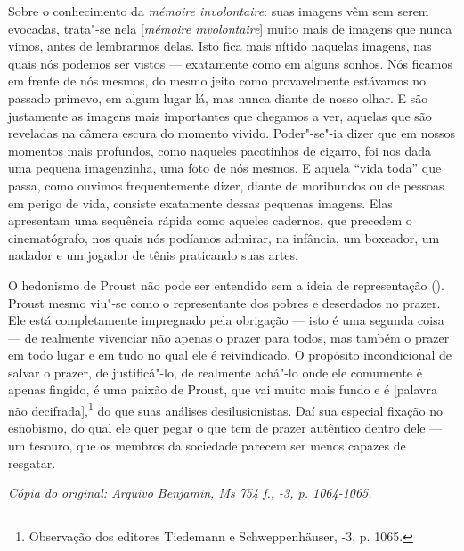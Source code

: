Sobre o conhecimento da \emph{mémoire involontaire}: suas imagens vêm
sem serem evocadas, trata"-se nela {[}\emph{mémoire
involontaire}{]} muito mais de imagens que nunca vimos, antes de
lembrarmos delas. Isto fica mais nítido naquelas imagens, nas quais nós
podemos ser vistos --- exatamente como em alguns sonhos. Nós ficamos em
frente de nós mesmos, do mesmo jeito como provavelmente estávamos no
passado primevo, em algum lugar lá, mas nunca diante de nosso olhar. E
são justamente as imagens mais importantes que chegamos a ver, aquelas
que são reveladas na câmera escura do momento vivido. Poder"-se"-ia dizer
que em nossos momentos mais profundos, como naqueles pacotinhos de
cigarro, foi nos dada uma pequena imagenzinha, uma foto de nós mesmos. E
aquela ``vida toda'' que passa, como ouvimos frequentemente dizer,
diante de moribundos ou de pessoas em perigo de vida, consiste
exatamente dessas pequenas imagens. Elas apresentam uma sequência rápida
como aqueles cadernos, que precedem o cinematógrafo, nos quais nós
podíamos admirar, na infância, um boxeador, um nadador e um jogador de
tênis praticando suas artes.

O hedonismo de Proust não pode ser entendido sem a ideia de
representação (). Proust mesmo viu"-se como o representante dos pobres e
deserdados no prazer. Ele está completamente impregnado pela obrigação
--- isto é uma segunda coisa --- de realmente vivenciar não apenas o
prazer para todos, mas também o prazer em todo lugar e em tudo no qual
ele é reivindicado. O propósito incondicional de salvar o prazer, de
justificá"-lo, de realmente achá"-lo onde ele comumente é apenas fingido,
é uma paixão de Proust, que vai muito mais fundo e é {[}palavra não
decifrada{]},\footnote{Observação dos editores Tiedemann e
  Schweppenhäuser, -3, p. 1065. \versal{[N. E.]}} do que suas análises
desilusionistas. Daí sua especial fixação no esnobismo, do qual ele quer
pegar o que tem de prazer autêntico dentro dele --- um tesouro, que os
membros da sociedade parecem ser menos capazes de resgatar.

\begin{flushright}
\emph{\small{Cópia do original: Arquivo Benjamin, Ms 754 f., -3, p. 1064-1065.}}
\end{flushright}
